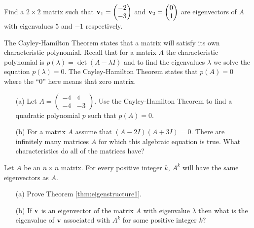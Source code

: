 \begin{problem}
    Find a $2 \times 2$ matrix such that ${\bf v}_1 = \begin{pmatrix}-2\\-3\end{pmatrix}$ and
    ${\bf v}_2=\begin{pmatrix}0\\1\end{pmatrix}$ are eigenvectors of $A$ with eigenvalues $5$
    and $-1$ respectively.
\end{problem}


\begin{problem}
    The Cayley-Hamilton Theorem states that a matrix will satisfy its own characteristic
    polynomial.  Recall that for a matrix $A$ the characteristic polynomial is $p(\lambda)
    = \det(A - \lambda I)$ and to find the eigenvalues $\lambda$ we solve the equation
    $p(\lambda) = 0$.  The Cayley-Hamilton Theorem states that $p(A) = 0$ where the ``0''
    here means that zero matrix.  
    \begin{enumerate}
        \item[(a)] Let $A = \begin{pmatrix} -4 & 4 \\ -4 & -3 \end{pmatrix}$.  Use the
            Cayley-Hamilton Theorem to find a quadratic polynomial $p$ such that $p(A) =
            0$.
        \item[(b)] For a matrix $A$ assume that $(A - 2I)(A+3I) = 0$.  There are
            infinitely many matrices $A$ for which this algebraic equation is true.  What
            characteristics do all of the matrices have?
    \end{enumerate}
\end{problem}


\begin{thm}\label{thm:eigenstructure1}
    Let $A$ be an $n\times n$ matrix.  For every positive integer $k$, $A^k$ will have the
    same eigenvectors as $A$.
\end{thm}
\begin{problem}
    \begin{enumerate}
        \item[(a)] Prove Theorem \ref{thm:eigenstructure1}.
        \item[(b)] If ${\bf v}$ is an eigenvector of the matrix $A$ with eigenvalue $\lambda$
            then what is the eigenvalue of ${\bf v}$ associated with $A^k$ for some positive
            integer $k$?
    \end{enumerate}
\end{problem}


